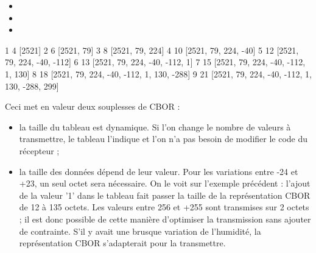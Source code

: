 \begin{itemize}
    \item 
    \item 
    \item 
\end{itemize}

       \vspace{1em}



\begin{termc}[backgroundcolor=\color{palerod}, basicstyle=\ttfamily\small, escapechar=\#]
1 4 [2521]
2 6 [2521, 79]
3 8 [2521, 79, 224]
4 10 [2521, 79, 224, -40]
5 12 [2521, 79, 224, -40, -112]
6 13 [2521, 79, 224, -40, -112, 1]
7 15 [2521, 79, 224, -40, -112, 1, 130]
8 18 [2521, 79, 224, -40, -112, 1, 130, -288]
9 21 [2521, 79, 224, -40, -112, 1, 130, -288, 299]
\end{termc}

Ceci met en valeur deux souplesses de CBOR :
\begin{itemize}
    \item la taille du tableau est dynamique. Si l’on change le nombre de valeurs à transmettre, le tableau l’indique et l’on n’a pas besoin de modifier le code du récepteur ;
    \item la taille des données dépend de leur valeur. 
    Pour les variations entre -24 et +23, un seul octet sera nécessaire. 
    On le voit sur l’exemple précédent : l’ajout de la valeur '1' dans le tableau fait passer la taille de la représentation CBOR de 12 à 135 octets. Les valeurs entre 256 et +255 sont transmises sur 2 octets ; il est donc possible de cette manière d’optimiser la transmission sans ajouter de contrainte. S’il y avait une brusque variation de l’humidité, la représentation CBOR s’adapterait pour la transmettre.
\end{itemize}


